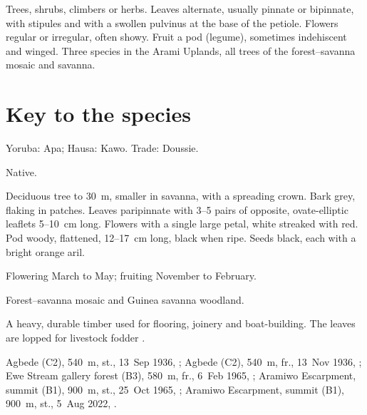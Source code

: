 \label{fam:fabaceae}

Trees, shrubs, climbers or herbs. Leaves alternate, usually pinnate or
bipinnate, with stipules and with a swollen pulvinus at the base of
the petiole. Flowers regular or irregular, often showy. Fruit a pod
(legume), sometimes indehiscent and winged. Three species in the Arami
Uplands, all trees of the forest--savanna mosaic and savanna.

\section*{Key to the species}
\begin{florakey}
\end{florakey}

\label{sp:FAB01}

 Yoruba: Apa; Hausa: Kawo. Trade:
Doussie.

 Native.

 Deciduous tree to 30~m, smaller in savanna, with a
spreading crown. Bark grey, flaking in patches. Leaves paripinnate
with 3--5 pairs of opposite, ovate-elliptic leaflets 5--10~cm long.
Flowers with a single large petal, white streaked with red. Pod woody,
flattened, 12--17~cm long, black when ripe. Seeds black, each with a
bright orange aril.

 Flowering March to May; fruiting November to
February.

 Forest--savanna mosaic and Guinea savanna woodland.

 A heavy, durable timber used for flooring, joinery and
boat-building. The leaves are lopped for livestock fodder
\citep{arbonnier2004,louppe2008}.

 Agbede (C2), 540~m, st., 13~Sep 1936, ;
Agbede (C2), 540~m, fr., 13~Nov 1936, ;
Ewe Stream gallery forest (B3), 580~m, fr., 6~Feb 1965, ;
Aramiwo Escarpment, summit (B1), 900~m, st., 25~Oct 1965, ;
Aramiwo Escarpment, summit (B1), 900~m, st., 5~Aug 2022, .

